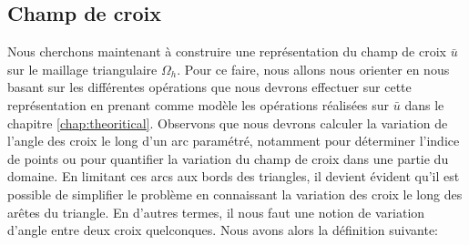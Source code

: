 \subsection{Champ de croix}
\label{subsec:discr_champ_de_croix}

Nous cherchons maintenant à construire une représentation du champ de croix $\bar{u}$ sur le maillage triangulaire $\Omega_h$. Pour ce faire, nous allons nous orienter en nous basant sur les différentes opérations que nous devrons effectuer sur cette représentation en prenant comme modèle les opérations réalisées sur $\bar{u}$ dans le chapitre \ref{chap:theoritical}. Observons que nous devrons calculer la variation de l'angle des croix le long d'un arc paramétré, notamment pour déterminer l'indice de points ou pour quantifier la variation du champ de croix dans une partie du domaine. En limitant ces arcs aux bords des triangles, il devient évident qu'il est possible de simplifier le problème en connaissant la variation des croix le long des arêtes du triangle. En d'autres termes, il nous faut une notion de variation d'angle entre deux croix quelconques. Nous avons alors la définition suivante:

